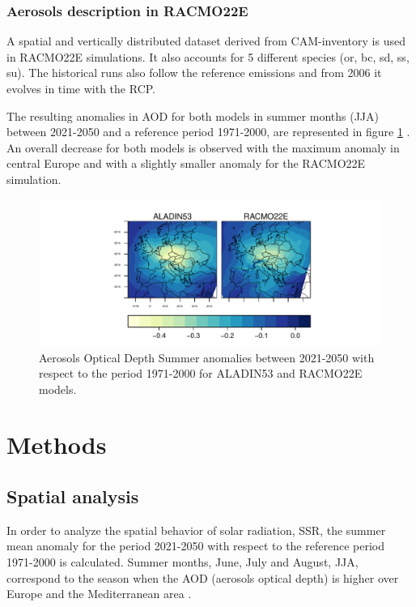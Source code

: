 \subsubsection{Aerosols description in RACMO22E}

A spatial and vertically distributed dataset derived from CAM-inventory \cite*{Lamarque2010} is used in RACMO22E simulations. It also accounts for 5 different species (or, bc, sd, ss, su). The historical runs also follow the reference emissions \cite*{Lamarque2010} and from 2006 it evolves in time with the RCP.

The resulting anomalies in AOD for both models in summer months (JJA) between 2021-2050 and a reference period 1971-2000, are represented in figure \ref{fig:aod} . An overall decrease for both models is observed with the maximum anomaly in central Europe and with a slightly smaller anomaly for the RACMO22E simulation.

\begin{figure}[h!]
\centering\includegraphics[width=1\textwidth]{figs/capitulo7/ANOMALIAS_JJA_AOD_2050-2021_r12.pdf}
\caption[Aerosol optical depth summer anomalies between 2050-2021 with respect to 1971-2000 over Europe]{Aerosols Optical Depth Summer anomalies between 2021-2050 with respect to the period 1971-2000 for ALADIN53 and RACMO22E models.}
\label{fig:aod}
\end{figure}

{\section{Methods}\label{Methods}}

\subsection{Spatial analysis}

In order to analyze the spatial behavior of solar radiation, SSR, the summer mean anomaly for the period 2021-2050 with respect to the reference period 1971-2000 is calculated. Summer months, June, July and August, JJA, correspond to the season when the AOD (aerosols optical depth) is higher over Europe and the Mediterranean area \cite*{Lelieveld}.


